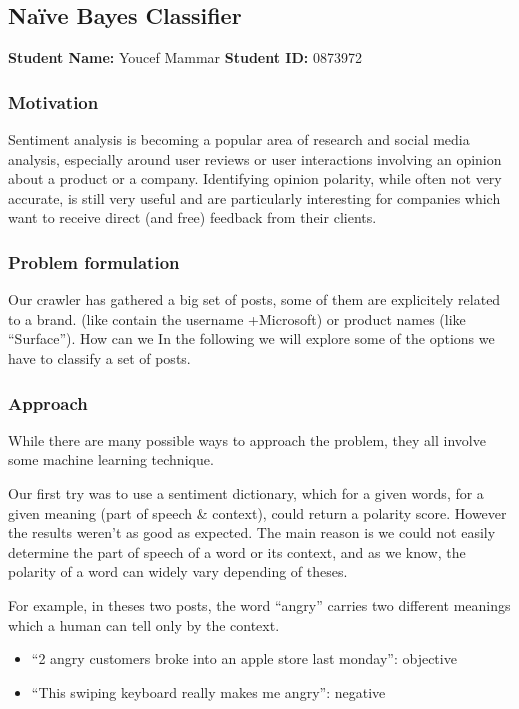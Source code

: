 \subsection{Naïve Bayes Classifier}
\textbf{Student Name: }Youcef Mammar \textbf{Student ID:} 0873972\\

\subsubsection*{Motivation}
Sentiment analysis is becoming a popular area of research and social media analysis, 
especially around user reviews or user interactions involving an opinion about a product 
or a company. Identifying opinion polarity, while often not very accurate, is still very 
useful and are particularly interesting for companies which want to receive direct (and free) 
feedback from their clients.

\subsubsection*{Problem formulation}
Our crawler has gathered a big set of posts, some of them are explicitely related to a brand. 
(like contain the username +Microsoft) or product names (like “Surface”). How can we 
In the following we will explore some of the options we have to classify a set of posts. 



\subsubsection*{Approach}

While there are many possible ways to approach the problem, they all involve some machine learning technique.

Our first try was to use a sentiment dictionary, which for a given words, for a given meaning (part of speech \& 
context), could return a polarity score. However the results weren’t as good as expected. The main reason is we 
could not easily determine the part of speech of a word or its context, and as we know, the polarity of a word can widely vary depending of theses.

For example, in theses two posts, the word “angry” carries two different meanings which a human can tell only by the context. 
\begin{itemize}
 \item ``2 angry customers broke into an apple store last monday'': objective
 \item ``This swiping keyboard really makes me angry'': negative

\end{itemize}


